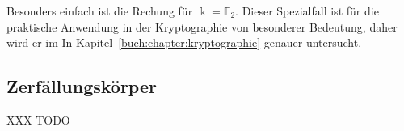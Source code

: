 Besonders einfach ist die Rechung für $\Bbbk=\mathbb{F}_2$.
Dieser Spezialfall ist für die praktische Anwendung in der Kryptographie
von besonderer Bedeutung, daher wird er im 
In Kapitel~\ref{buch:chapter:kryptographie} genauer untersucht.

\subsection{Zerfällungskörper
\label{buch:subsection:zerfaellungskoerper}}
XXX TODO




